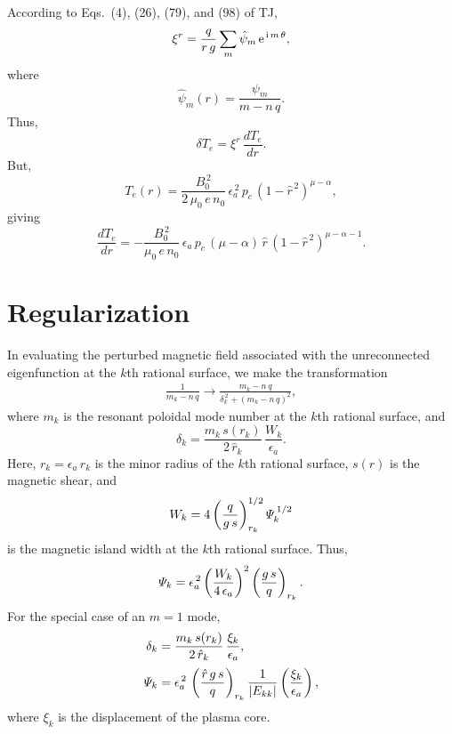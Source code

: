 \documentclass[12pt,prb,aps,notitlepage]{revtex4-1}
\begin{document}
According to Eqs.~(4), (26), (79), and (98) of TJ, 
\begin{equation}
\xi^r = \frac{q}{r\,g}\sum_m \hat{\psi}_m\,{\rm e}^{\,{\rm i}\,m\,\theta},
\end{equation}
where
\begin{equation}
\hat{\psi}_m(r) = \frac{\psi_m}{m-n\,q}.
\end{equation}
Thus,
\begin{equation}
\delta T_e = \xi^r\,\frac{dT_e}{dr}.
\end{equation}
But,
\begin{equation}
T_e(r) = \frac{B_0^{\,2}}{2\,\mu_0\,e\,n_0}\,\epsilon_a^{\,2}\,p_c\,(1-\hat{r}^{\,2})^{\mu-\alpha},
\end{equation}
giving
\begin{equation}
\frac{dT_e}{dr} = - \frac{B_0^{\,2}}{\mu_0\,e\,n_0}\,\epsilon_a\,p_c\,(\mu-\alpha)\,\hat{r}\,(1-\hat{r}^{\,2})^{\mu-\alpha-1}.
\end{equation}

\section{Regularization}
In evaluating the perturbed magnetic field associated with the unreconnected eigenfunction at the $k$th rational surface, we make the
transformation
\begin{align}
\frac{1}{m_k-n\,q} \rightarrow \frac{m_k-n\,q}{\delta_k^{\,2} + (m_k-n\,q)^2},
\end{align}
where $m_k$ is the resonant poloidal mode number at the $k$th rational surface, and
\begin{equation}
\delta_k = \frac{m_k\,s(r_k)}{2\,\hat{r}_k}\,\frac{W_k}{\epsilon_a}.
\end{equation}
Here, $r_k=\epsilon_a\,\hat{r}_k$ is the minor radius of the $k$th rational surface, $s(r)$ is the magnetic shear, and 
\begin{equation}
W_k = 4\left(\frac{q}{g\,s}\right)_{r_k}^{1/2}{\mit\Psi}_k^{\,1/2}
\end{equation}
is the magnetic island width at the $k$th rational surface. 
Thus, 
\begin{equation}
{\mit\Psi}_k= \epsilon_a^{\,2} \left(\frac{W_k}{4\,\epsilon_a}\right)^2\left(\frac{g\,s}{q}\right)_{r_k}.
\end{equation}
For the special case of an $m=1$ mode,
\begin{align}
\delta_k &= \frac{m_k\,s(r_k)}{2\,\hat{r}_k}\,\frac{\xi_k}{\epsilon_a},\\[0.5ex]
{\mit\Psi}_k &= \epsilon_a^{\,2}\,\left(\frac{\hat{r}\,g\,s}{q}\right)_{r_k}\frac{1}{|E_{kk}|} \left(\frac{\xi_k}{\epsilon_a}\right),
\end{align}
where $\xi_k$ is the displacement of the plasma core. 
\end{document}
